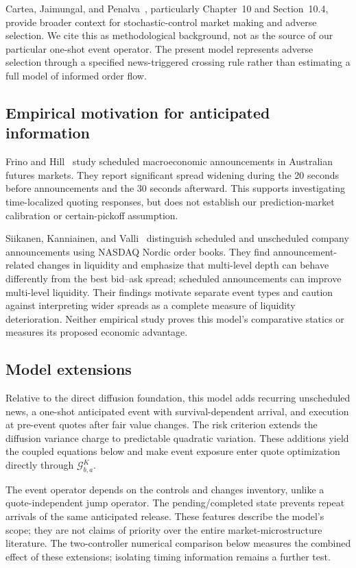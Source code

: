 \documentclass[11pt]{article}
\newcommand{\1}{\mathbf 1}
\newcommand{\G}{\mathcal G}
\begin{document}
Cartea, Jaimungal, and Penalva~\cite{cartea2015}, particularly Chapter~10 and
Section~10.4, provide broader context for stochastic-control market making and
adverse selection. We cite this as methodological background, not as the source
of our particular one-shot event operator. The present model represents adverse selection
through a specified news-triggered crossing rule rather than estimating a full
model of informed order flow.

\subsection{Empirical motivation for anticipated information}
Frino and Hill~\cite{frinohill2001} study scheduled macroeconomic announcements
in Australian futures markets. They report significant spread widening during
the 20 seconds before announcements and the 30 seconds afterward. This supports
investigating time-localized quoting responses, but does not establish our
prediction-market calibration or certain-pickoff assumption.

Siikanen, Kanniainen, and Valli~\cite{siikanen2017} distinguish scheduled and
unscheduled company announcements using NASDAQ Nordic order books. They find
announcement-related changes in liquidity and emphasize that multi-level depth
can behave differently from the best bid--ask spread; scheduled announcements
can improve multi-level liquidity. Their findings motivate separate event
types and caution against interpreting wider spreads as a complete measure of
liquidity deterioration. Neither empirical study proves this model's comparative
statics or measures its proposed economic advantage.

\subsection{Model extensions}
Relative to the direct diffusion foundation, this model adds recurring unscheduled
news, a one-shot anticipated event with survival-dependent arrival, and
execution at pre-event quotes after fair value changes. The risk criterion
extends the diffusion variance charge to predictable quadratic variation.
These additions yield the coupled equations below and make event exposure
enter quote optimization directly through $\G^K_{b,a}$.

The event operator depends on the controls and changes inventory, unlike a
quote-independent jump operator. The pending/completed state prevents repeat
arrivals of the same anticipated release. These features describe the model's
scope; they are not claims of priority over the entire market-microstructure literature.
The two-controller numerical comparison below measures the combined effect
of these extensions; isolating timing information remains a further test.
\end{document}
